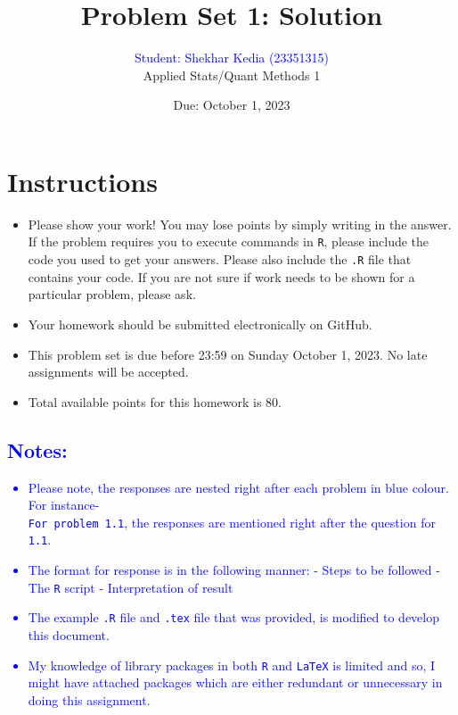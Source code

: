\documentclass[12pt,letterpaper]{article}
\title{Problem Set 1: Solution}
\date{Due: October 1, 2023}
\author{\textcolor{blue}{Student: Shekhar Kedia (23351315)}\\
	Applied Stats/Quant Methods 1}
\begin{document}
\maketitle

\section*{Instructions}
	\begin{itemize}
	\item Please show your work! You may lose points by simply writing in the answer. If the problem requires you to execute commands in \texttt{R}, please include the code you used to get your answers. Please also include the \texttt{.R} file that contains your code. If you are not sure if work needs to be shown for a particular problem, please ask.
	\item Your homework should be submitted electronically on GitHub.
	\item This problem set is due before 23:59 on Sunday October 1, 2023. No late assignments will be accepted.
	\item Total available points for this homework is 80.
	\end{itemize}	
\vspace{0.5cm}

\textcolor{blue}{
\section*{Notes:}
\begin{itemize}
	\item Please note, the responses are nested right after each problem in blue colour.\\ For instance-\\ \texttt{For problem 1.1}, the responses are mentioned right after the question for \texttt{1.1}.
	\item The format for response is in the following manner:
	\subitem - Steps to be followed
	\subitem - The \texttt{R} script
	\subitem - Interpretation of result
	\item The example \texttt{.R} file and \texttt{.tex} file that was provided, is modified to develop this document.
	\item My knowledge of library packages in both \texttt{R} and \texttt{LaTeX} is limited and so, I might have attached packages which are either redundant or unnecessary in doing this assignment.
\end{itemize}	
\vspace{0.5cm}
}	
\end{document}
